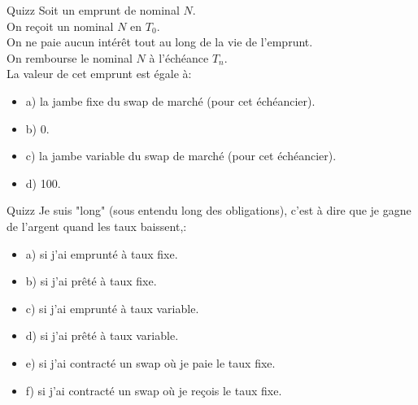 \documentclass{beamer}
\begin{document}
\begin{frame}{Quizz}
Soit un emprunt de nominal $N$.\\ 
On reçoit un nominal $N$ en $T_0$.\\
On ne paie aucun intérêt tout au long de la vie de l'emprunt.\\
On rembourse le nominal $N$ à l'échéance $T_n$.\\
\vspace{0.5cm}
La valeur de cet emprunt est égale à:
\begin{itemize}
\item a) la jambe fixe du swap de marché (pour cet échéancier).
\item b) 0.
\item c) la jambe variable du swap de marché (pour cet échéancier).
\item d) 100.
\end{itemize}
\end{frame}

\begin{frame}{Quizz}
Je suis "long" (sous entendu long des obligations), c'est à dire que je gagne de l'argent quand les taux baissent,:
\begin{itemize}
\item a) si j'ai emprunté à taux fixe.
\item b) si j'ai prêté à taux fixe.
\item c) si j'ai emprunté à taux variable.
\item d) si j'ai prêté à taux variable.
\item e) si j'ai contracté un swap où je paie le taux fixe.
\item f) si j'ai contracté un swap où je reçois le taux fixe.
\end{itemize}
\end{frame}
\end{document}
